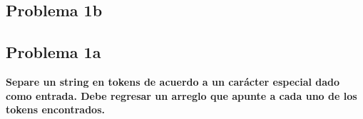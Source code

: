 \subsection*{Problema 1b}

\subsection*{Problema 1a}
\textbf{Separe un string en tokens de acuerdo a un carácter especial dado como entrada. Debe regresar un arreglo que apunte a cada uno de los tokens encontrados.}

